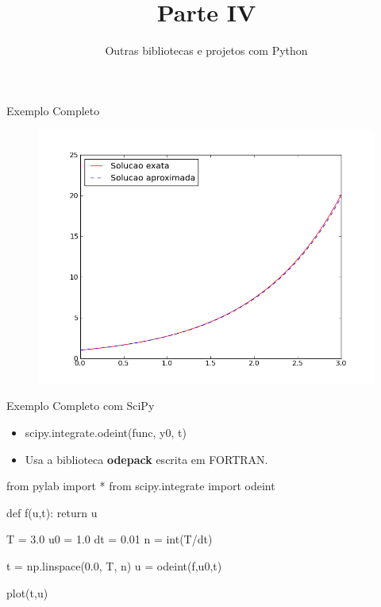 \documentclass[12pt,t,graphics]{beamer}
\begin{document}
\begin{frame}[t,fragile]{Exemplo Completo}
	\vspace{-0.5cm}
	\begin{figure}
		\centering
		\includegraphics[scale=0.45]{img/euler.png}
	\end{figure}
\end{frame}

\begin{frame}[t,fragile]{Exemplo Completo com SciPy}
	\begin{itemize}
		\item scipy.integrate.odeint(func, y0, t)
		\item Usa a biblioteca \textbf{odepack} escrita em FORTRAN.
	\end{itemize}
	\begin{python}[]
from pylab import *
from scipy.integrate import odeint

def f(u,t):
  return u

T  = 3.0
u0 = 1.0
dt = 0.01
n  = int(T/dt)

t = np.linspace(0.0, T, n)
u = odeint(f,u0,t)

plot(t,u)
	\end{python}
\end{frame}


\begin{frame}
	\title{Parte IV}
	\subtitle{Outras bibliotecas e projetos com Python}
	\date{}\author{}\institute{}\date{}
	\maketitle
\end{frame}
\end{document}
